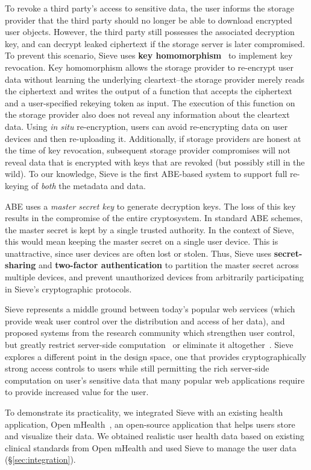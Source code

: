 \begin{smitemize}
  \item To revoke a third party's access to sensitive data,
  the user informs the storage provider that the third
  party should no longer be able to download encrypted
  user objects. However, the third party still possesses
  the associated decryption key, and can decrypt leaked
  ciphertext if the storage server is later compromised.
  To prevent this scenario, Sieve uses \textbf{key
  homomorphism}~\cite{keyhom} to implement key revocation. Key
  homomorphism allows the storage provider
  to re-encrypt user data without learning the underlying
  cleartext--the storage provider merely reads the
  ciphertext and writes the output of a function that
  accepts the ciphertext and a user-specified rekeying
  token as input. The execution of this function on the storage 
  provider also does not reveal any information about the 
  cleartext data. Using \textit{in situ} re-encryption,
  users can avoid re-encrypting data on user devices and
  then re-uploading it. Additionally, if storage providers
  are honest at the time of key revocation, subsequent
  storage provider compromises will not reveal data that
  is encrypted with keys that are revoked (but possibly
  still in the wild). To our knowledge, Sieve is the first 
  ABE-based system to support full re-keying of \textit{both}
  the metadata and data.

  \item ABE uses a \emph{master secret key} to generate
  decryption keys. The loss of this key results
  in the compromise of the entire cryptosystem. In
  standard ABE schemes, the master secret is kept by a
  single trusted authority. In the context of Sieve,
  this would mean keeping the master secret on a single
  user device. This is unattractive, since user devices
  are often lost or stolen. Thus, Sieve
  uses \textbf{secret-sharing} and \textbf{two-factor
  authentication} to partition the master secret across
  multiple devices, and prevent unauthorized devices
  from arbitrarily participating in Sieve's cryptographic
  protocols.
    
\end{smitemize}

Sieve represents a middle ground between today's
popular web services (which provide weak user
control over the distribution and access of her data), 
and proposed systems from the
research community which strengthen user control,
but greatly restrict server-side computation~\cite{mylar}
or eliminate it altogether~\cite{sundr,depot,sporc,bstore,depSky}.
Sieve explores a
different point in the design space, one that
provides cryptographically strong access controls
to users while still permitting the rich
server-side computation on user's sensitive data
that many popular web
applications require to provide increased value
for the user.

To demonstrate its practicality, we integrated Sieve with
an existing health application, Open mHealth~\cite{omh},
an open-source application that 
helps users store and visualize their data. We obtained
realistic user health data based on existing clinical standards
from Open mHealth and used Sieve 
to manage the user data (\S\ref{sec:integration}).
